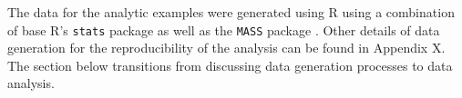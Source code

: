 \documentclass[ShortAfour,times,sageapa]{sagej}
\begin{document}
	
	The data for the analytic examples were generated using R \cite{R} using a combination of base R's \texttt{stats} package as well as the \texttt{MASS} package \cite{MASS}.  
	Other details of data generation for the reproducibility of the analysis can be found in Appendix X.  
	The section below transitions from discussing data generation processes to data analysis.
%	
%	
%	
%	
%	
\end{document}
